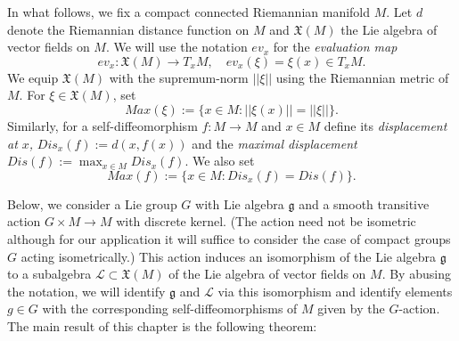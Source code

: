 \documentclass[12pt]{amsbook}%
\theoremstyle{definition}
\theoremstyle{remark}
\numberwithin{section}{chapter}
\numberwithin{subsection}{section}
\numberwithin{figure}{chapter}
\def\cL{{\mathscr{L}}}
\begin{document}
{{In what follows, we fix a compact connected Riemannian manifold $M$. Let $d$ denote the Riemannian distance function on $M$ and   
$\mathfrak{X}(M)$ the Lie algebra of vector fields on $M$. 
We will use the notation $ev_x$ for the {\em evaluation map}  
$$
ev_x: \mathfrak{X}(M)\to T_xM, \quad ev_x(\xi)=\xi(x)\in T_xM.
$$
We equip $\mathfrak{X}(M)$ with the 
supremum-norm $||\xi||$ using the Riemannian metric of $M$. For $\xi\in \mathfrak{X}(M)$, set 
$$
Max(\xi):= \{x\in M: ||\xi(x)||=||\xi||\}.$$ 
Similarly, for a self-diffeomorphism $f: M\to M$ and $x\in M$ define its {\em displacement at $x$,} $Dis_x(f):=d(x, f(x))$ and the {\em maximal displacement} 
$Dis(f):=  \max_{x\in M} Dis_x(f)$. We also set 
$$
Max(f):=\{x\in M: Dis_x(f)=Dis(f)\}.
$$   
 
Below, we consider a Lie group $G$ with Lie algebra $ {\mathfrak g}$ and a smooth transitive 
action  $G\times M\to M$ with discrete kernel. (The action need not be isometric although for our application it 
will suffice to consider the case of compact groups $G$ acting isometrically.) 
This action induces an isomorphism of the Lie algebra ${\mathfrak g}$ to a 
subalgebra $\cL\subset \mathfrak{X}(M)$ of the Lie algebra of vector fields on $M$. 
By abusing the notation, we will identify ${\mathfrak g}$ and $\cL$ via this isomorphism and identify elements $g\in G$ 
with the corresponding self-diffeomorphisms of $M$ given by the $G$-action. 
The main result of this chapter is the following theorem: 

}}
\end{document}
